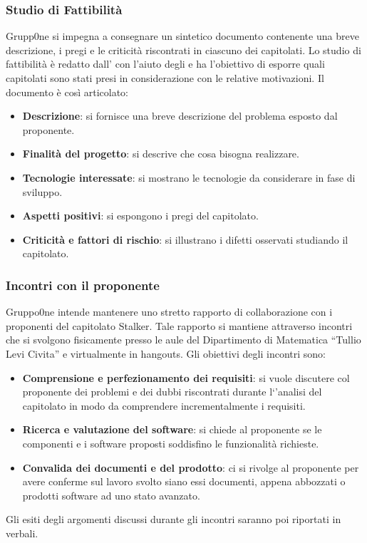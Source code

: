 \documentclass[../norme-di-progetto.tex]{subfiles}
\begin{document}
\subsubsection{Studio di Fattibilità}
\label{subs:studio di fattibilità}
Grupp0ne si impegna a consegnare un sintetico documento contenente una breve descrizione, i pregi e le criticità riscontrati in ciascuno dei capitolati. Lo studio di fattibilità è redatto dall'
con l'aiuto degli  e ha l'obiettivo di esporre quali capitolati sono stati presi in considerazione con le relative motivazioni. Il documento è così articolato:
\begin{itemize}
\item \textbf{Descrizione}: si fornisce una breve descrizione del problema esposto dal proponente.
\item \textbf{Finalità del progetto}: si descrive che cosa bisogna realizzare.
\item \textbf{Tecnologie interessate}: si mostrano le tecnologie da considerare in fase di sviluppo.
\item \textbf{Aspetti positivi}: si espongono i pregi del capitolato.
\item \textbf{Criticità e fattori di rischio}: si illustrano i difetti osservati studiando il capitolato.
\end{itemize}
\subsubsection{Incontri con il proponente}
\label{subs:incontri con il proponente}
Gruppo0ne intende mantenere uno stretto rapporto di collaborazione con i proponenti del capitolato Stalker. Tale rapporto si mantiene attraverso incontri che si svolgono fisicamente presso le aule del Dipartimento di Matematica ``Tullio Levi Civita'' e virtualmente in hangouts.
Gli obiettivi degli incontri sono:
\begin{itemize}
\item \textbf{Comprensione e perfezionamento dei requisiti}: si vuole discutere col proponente dei problemi e dei dubbi riscontrati durante l`'analisi del capitolato in modo da comprendere incrementalmente i requisiti.
\item \textbf{Ricerca e valutazione del software}: si chiede al proponente se le componenti e i software proposti soddisfino le funzionalità richieste.
\item \textbf{Convalida dei documenti e del prodotto}: ci si rivolge al proponente per avere conferme sul lavoro svolto siano essi documenti,  appena abbozzati o prodotti software ad uno stato avanzato.
\end{itemize}
Gli esiti degli argomenti discussi durante gli incontri saranno poi riportati in verbali.
\end{document}
